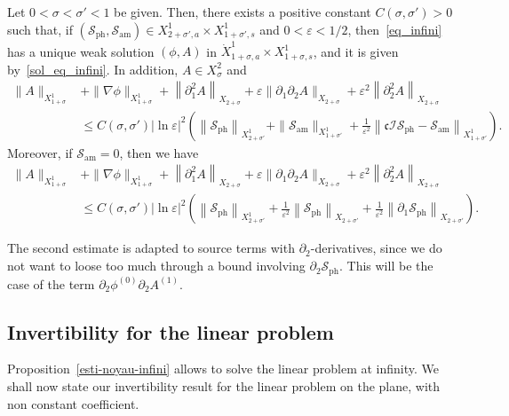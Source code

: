 \documentclass[AHL,Unicode,longabstracts,published]{cedram}
\newcommand*\p{\partial}
\newcommand{\amm}{\mathrm{am}}
\newcommand{\phl}{\mathrm{ph}}
\newcommand*\BI{\mathcal{I}}
\newcommand*\BS{\mathcal{S}}
\newcommand*\cs{{\mathfrak c}}
\newcommand*\ls{\leqslant }
\newcommand*\e{\varepsilon}
\newcommand*\lne{\lvert \ln \varepsilon \rvert}
\newcommand*\s{\sigma}
\begin{document}
\begin{prop}\label{esti-noyau-infini}
Let $ 0 < \s < \s' < 1 $ be given. Then, there exists a positive constant $ C (\s, \s') > 0 $ such that, if $ (\BS_{\phl}, \BS_{\amm})
\in X^{1}_{2+\s', a} \times X^{1}_{1+\s', s} $ and $ 0 < \e < 1/2 $, then~\eqref{eq_infini} has a unique weak solution $(\phi,A) $ in $ \dot{X}^1_{ 1 + \s, a } \times X^{1}_{ 1+ \s, s} $, and it is given by~\eqref{sol_eq_infini}. In addition, $ A \in X^2_\s $ and
\begin{align*}
\| A \|_{ X^{1}_{ 1+\s} } & + \| \nabla \phi \|_{ X^{1}_{ 1 +\s} } + \left\| \p_1^2 A \right\|_{ X_{2 +\s} } + \e \| \p_1 \p_2 A \|_{ X_{2 +\s} } + \e^2 \left\| \p_2^2 A \right\|_{ X_{2+\s} }
\\ & \ls C (\s, \s') \lne^2
\left(
\left\| \BS_{\phl} \right\|_{ X^{1}_{2+\s' } } + \| \BS_{\amm} \|_{ X^{1 }_{ 1+ \s'} } + \frac{1}{\e^2} \left\| \cs \BI \BS_{\phl} - \BS_{\amm} \right\|_{ X^{1}_{ 1 + \s' } }
\right).
\end{align*}
Moreover, if $ \BS_{\amm} = 0 $, then we have
\begin{align*}
\| A \|_{ X^{1}_{ 1+\s} } & + \| \nabla \phi \|_{ X^{1}_{ 1 +\s} } + \left\| \p_1^2 A \right\|_{ X_{2 +\s} } + \e \| \p_1 \p_2 A \|_{ X_{2 +\s} } + \e^2 \left\| \p_2^2 A \right\|_{ X_{2+\s} }
\\& \ls C (\s, \s') \lne^2
\left(
\left\| \BS_{\phl} \right\|_{ X^{1}_{2+\s' } } + \frac{1}{\e^2} \left\| \BS_{\phl} \right\|_{ X_{ 2 + \s' } } + \frac{1}{\e^2} \left\| \p_1 \BS_{\phl} \right\|_{ X_{ 2 + \s' } }
\right).
\end{align*}
\end{prop}

\begin{rema}
The second estimate is adapted to source terms with $ \p_2 $-derivatives, since we do not want to loose too much through a bound involving $ \p_2 \BS_{\phl} $. This will be the case of the term $ \p_2 \phi^{(0)} \p_2 A^{(1)} $.
\end{rema}



\subsection{Invertibility for the linear problem}


Proposition~\ref{esti-noyau-infini} allows to solve the linear problem at infinity. We shall now state our invertibility result for the linear problem on the plane, with non constant coefficient.
\end{document}
